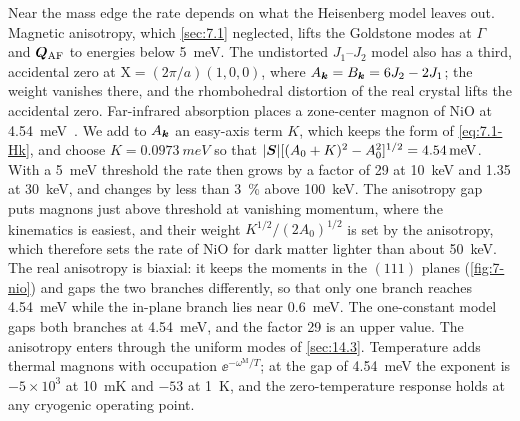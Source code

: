 Near the mass edge the rate depends on what the Heisenberg model leaves out. Magnetic anisotropy, which \cref{sec:7.1} neglected, lifts the Goldstone modes at $\Gamma$ and $\bm{Q}_{\mathrm{AF}}$ to energies below \SI{5}{meV}. The undistorted $J_1$--$J_2$ model also has a third, accidental zero at $\mathrm{X} = (2\pi/a)(1,0,0)$, where $A_{\bm{k}} = B_{\bm{k}} = 6J_2 - 2J_1$; the weight vanishes there, and the rhombohedral distortion of the real crystal lifts the accidental zero. Far-infrared absorption places a zone-center magnon of NiO at \SI{4.54}{meV}~\cites{hutchings1972measurement}[Sect.~III]{dossantos2026comparative}. We add to $A_{\bm{k}}$ an easy-axis term $K$, which keeps the form of \cref{eq:7.1-Hk}, and choose $K = \SI{0.0973}{meV}$ so that $|\bm{S}|[(A_0 + K)^2 - A_0^2]^{1/2} = \SI{4.54}{meV}$. With a \SI{5}{meV} threshold the rate then grows by a factor of 29 at \SI{10}{keV} and 1.35 at \SI{30}{keV}, and changes by less than \SI{3}{\percent} above \SI{100}{keV}. The anisotropy gap puts magnons just above threshold at vanishing momentum, where the kinematics is easiest, and their weight $K^{1/2}/(2A_0)^{1/2}$ is set by the anisotropy, which therefore sets the rate of NiO for dark matter lighter than about \SI{50}{keV}. The real anisotropy is biaxial: it keeps the moments in the $(111)$ planes (\cref{fig:7-nio}) and gaps the two branches differently, so that only one branch reaches \SI{4.54}{meV} while the in-plane branch lies near \SI{0.6}{meV}. The one-constant model gaps both branches at \SI{4.54}{meV}, and the factor 29 is an upper value. The anisotropy enters through the uniform modes of \cref{sec:14.3}. Temperature adds thermal magnons with occupation $\ee^{-\omega^{\mathrm{M}}/T}$; at the gap of \SI{4.54}{meV} the exponent is $-5\times10^3$ at \SI{10}{mK} and $-53$ at \SI{1}{K}, and the zero-temperature response holds at any cryogenic operating point.
